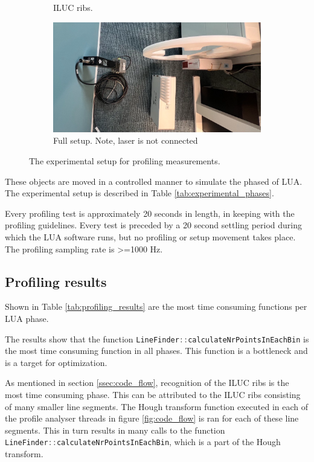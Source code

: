 \begin{figure}[H]
\begin{subfigure}{0.45\textwidth}
        \caption{ILUC ribs.}
    \end{subfigure}
    \centering
    \begin{subfigure}{0.9\textwidth}
        \centering
        \includegraphics[width=\textwidth]{images/test_setup.png}
        \caption{Full setup. Note, laser is not connected}
    \end{subfigure}
    \caption{The experimental setup for profiling measurements.}
\end{figure}


These objects are moved in a controlled manner to simulate the phased of LUA. The experimental setup is described in Table \ref{tab:experimental_phases}.



Every profiling test is approximately 20 seconds in length, in keeping with the profiling guidelines. Every test is preceded by a 20 second settling period during which the LUA software runs, but no profiling or setup movement takes place. The profiling sampling rate is >=1000 Hz.

\subsection{Profiling results} \label{ssec:profiling_results}
Shown in Table \ref{tab:profiling_results} are the most time consuming functions per LUA phase.



The results show that the function \lstinline[language=c]|LineFinder::calculateNrPointsInEachBin| is the most time consuming function in all phases. This function is a bottleneck and is a target for optimization.

As mentioned in section \ref{ssec:code_flow}, recognition of the ILUC ribs is the most time consuming phase. This can be attributed to the ILUC ribs consisting of many smaller line segments. The Hough transform function executed in each of the profile analyser threads in figure
\ref{fig:code_flow} is ran for each of these line segments. This in turn results in many calls to the function \lstinline[language=c]|LineFinder::calculateNrPointsInEachBin|, which is a part of the Hough transform.

